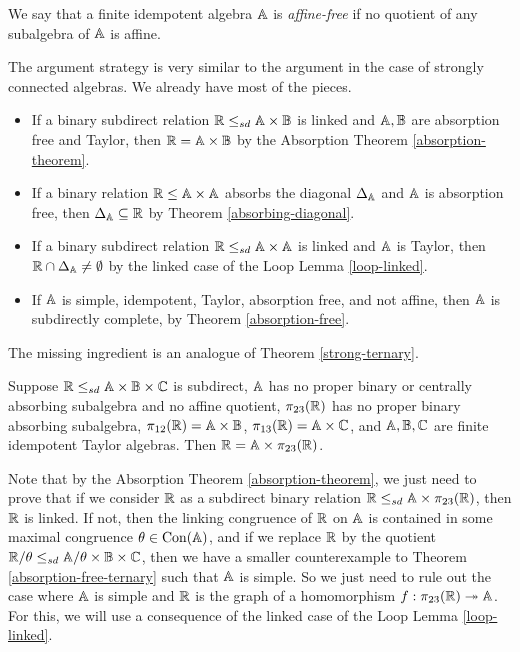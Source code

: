 \documentclass[letterpaper,11pt]{article}
\DeclareMathOperator{\Con}{Con}
\begin{document}
\begin{defn} We say that a finite idempotent algebra $\mathbb{A}$ is \emph{affine-free} if no quotient of any subalgebra of $\mathbb{A}$ is affine.
\end{defn}

The argument strategy is very similar to the argument in the case of strongly connected algebras. We already have most of the pieces.
\begin{itemize}
\item If a binary subdirect relation $\mathbb{R} \le_{sd} \mathbb{A} \times \mathbb{B}$ is linked and $\mathbb{A},\mathbb{B}$ are absorption free and Taylor, then $\mathbb{R} = \mathbb{A}\times \mathbb{B}$ by the Absorption Theorem \ref{absorption-theorem}.

\item If a binary relation $\mathbb{R} \le \mathbb{A} \times \mathbb{A}$ absorbs the diagonal $\Delta_{\mathbb{A}}$ and $\mathbb{A}$ is absorption free, then $\Delta_{\mathbb{A}} \subseteq \mathbb{R}$ by Theorem \ref{absorbing-diagonal}.

\item If a binary subdirect relation $\mathbb{R} \le_{sd} \mathbb{A} \times \mathbb{A}$ is linked and $\mathbb{A}$ is Taylor, then $\mathbb{R} \cap \Delta_{\mathbb{A}} \ne \emptyset$ by the linked case of the Loop Lemma \ref{loop-linked}.

\item If $\mathbb{A}$ is simple, idempotent, Taylor, absorption free, and not affine, then $\mathbb{A}$ is subdirectly complete, by Theorem \ref{absorption-free}.
\end{itemize}
The missing ingredient is an analogue of Theorem \ref{strong-ternary}.

\begin{thm}\label{absorption-free-ternary} Suppose $\mathbb{R} \le_{sd} \mathbb{A} \times \mathbb{B} \times \mathbb{C}$ is subdirect, $\mathbb{A}$ has no proper binary or centrally absorbing subalgebra and no affine quotient, $\pi_{23}(\mathbb{R})$ has no proper binary absorbing subalgebra, $\pi_{12}(\mathbb{R}) = \mathbb{A} \times \mathbb{B}$, $\pi_{13}(\mathbb{R}) = \mathbb{A}\times \mathbb{C}$, and $\mathbb{A},\mathbb{B},\mathbb{C}$ are finite idempotent Taylor algebras. Then $\mathbb{R} = \mathbb{A} \times \pi_{23}(\mathbb{R})$.
\end{thm}

Note that by the Absorption Theorem \ref{absorption-theorem}, we just need to prove that if we consider $\mathbb{R}$ as a subdirect binary relation $\mathbb{R} \le_{sd} \mathbb{A} \times \pi_{23}(\mathbb{R})$, then $\mathbb{R}$ is linked. If not, then the linking congruence of $\mathbb{R}$ on $\mathbb{A}$ is contained in some maximal congruence $\theta \in \Con(\bA)$, and if we replace $\mathbb{R}$ by the quotient $\mathbb{R}/\theta \le_{sd} \mathbb{A}/\theta \times \mathbb{B} \times \mathbb{C}$, then we have a smaller counterexample to Theorem \ref{absorption-free-ternary} such that $\mathbb{A}$ is simple. So we just need to rule out the case where $\mathbb{A}$ is simple and $\mathbb{R}$ is the graph of a homomorphism $f : \pi_{23}(\mathbb{R}) \twoheadrightarrow \mathbb{A}$. For this, we will use a consequence of the linked case of the Loop Lemma \ref{loop-linked}.
\end{document}
